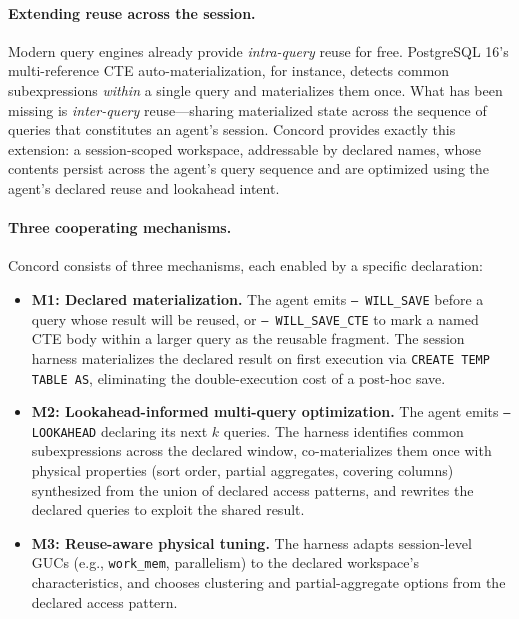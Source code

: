 \paragraph{Extending reuse across the session.}
Modern query engines already provide \emph{intra-query} reuse for free. PostgreSQL 16's multi-reference CTE auto-materialization, for instance, detects common subexpressions \emph{within} a single query and materializes them once. What has been missing is \emph{inter-query} reuse---sharing materialized state across the sequence of queries that constitutes an agent's session. Concord provides exactly this extension: a session-scoped workspace, addressable by declared names, whose contents persist across the agent's query sequence and are optimized using the agent's declared reuse and lookahead intent.

\paragraph{Three cooperating mechanisms.}
Concord consists of three mechanisms, each enabled by a specific declaration:

\begin{itemize}
\item \textbf{M1: Declared materialization.} The agent emits \texttt{-- WILL\_SAVE} before a query whose result will be reused, or \texttt{-- WILL\_SAVE\_CTE} to mark a named CTE body within a larger query as the reusable fragment. The session harness materializes the declared result on first execution via \texttt{CREATE TEMP TABLE AS}, eliminating the double-execution cost of a post-hoc save.

\item \textbf{M2: Lookahead-informed multi-query optimization.} The agent emits \texttt{-- LOOKAHEAD} declaring its next $k$ queries. The harness identifies common subexpressions across the declared window, co-materializes them once with physical properties (sort order, partial aggregates, covering columns) synthesized from the union of declared access patterns, and rewrites the declared queries to exploit the shared result.

\item \textbf{M3: Reuse-aware physical tuning.} The harness adapts session-level GUCs (e.g., \texttt{work\_mem}, parallelism) to the declared workspace's characteristics, and chooses clustering and partial-aggregate options from the declared access pattern.
\end{itemize}

